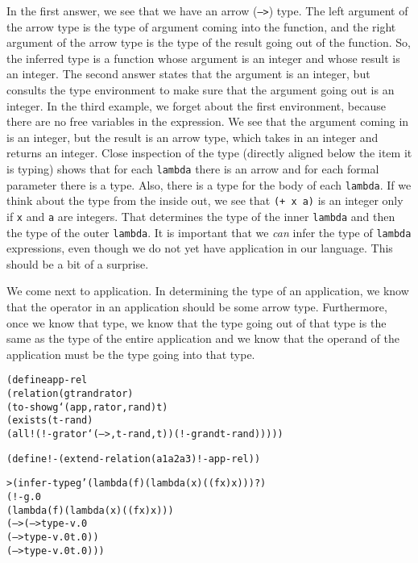 In the first answer, we see that we have an arrow (\texttt{-->})
type.  The left argument of the arrow type is the type of argument
coming into the function, and the right argument of the arrow type is
the type of the result going out of the function.  So, the inferred
type is a function whose argument is an integer and whose result is an
integer.  The second answer states that the argument is an integer,
but consults the type environment to make sure that the argument going
out is an integer.  In the third example, we forget about the first
environment, because there are no free variables in the expression. We
see that the argument coming in is an integer, but the result is an
arrow type, which takes in an integer and returns an integer.  Close
inspection of the type (directly aligned below the item it is typing)
shows that for each \texttt{lambda} there is an arrow and for each
formal parameter there is a type.  Also, there is a type for the body
of each \texttt{lambda}.  If we think about the type from the inside
out, we see that \texttt{(+ x a)} is an integer only if \texttt{x} and
\texttt{a} are integers.  That determines the type of the inner
\texttt{lambda} and then the type of the outer \texttt{lambda}.  It is
important that we \emph{can} infer the type of \texttt{lambda}
expressions, even though we do not yet have application in our language.
This should be a bit of a surprise.

We come next to application.  In determining the type of an
application, we know that the operator in an application should be
some arrow type.  Furthermore, once we know that type, we know that
the type going out of that type is the same as the type of the entire
application and we know that the operand of the application must be
the type going into that type.

\begin{alltt}
(define app-rel
  (relation (g t rand rator)
    (to-show g `(app ,rator ,rand) t)
    (exists (t-rand)
      (all! (!- g rator `(--> ,t-rand ,t)) (!- g rand t-rand)))))

(define !- (extend-relation (a1 a2 a3) !- app-rel))
\end{alltt}

\begin{alltt}
> (infer-type g '(lambda (f) (lambda (x) ((f x) x))) ?)
(!- g.0
    (lambda (f) (lambda (x) ((f x) x)))
    (--> (--> type-v.0
              (--> type-v.0 t.0))
         (--> type-v.0 t.0)))
\end{alltt}

